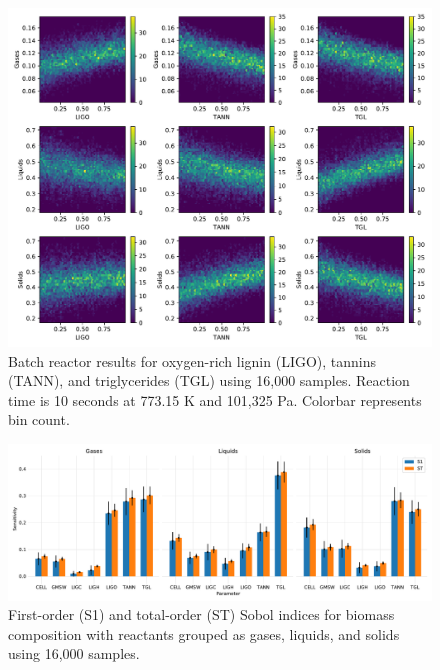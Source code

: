 \begin{figure}[H]
    \centering
    \includegraphics[width=\textwidth]{figures/sa-hexbin2-n1000.pdf}
    \caption{Batch reactor results for oxygen-rich lignin (LIGO), tannins (TANN), and triglycerides (TGL) using 16,000 samples. Reaction time is 10 seconds at 773.15 K and 101,325 Pa. Colorbar represents bin count.}
\end{figure}

\begin{figure}[H]
    \centering
    \includegraphics[width=\textwidth]{figures/sa-bar-n1000.pdf}
    \caption{First-order (S1) and total-order (ST) Sobol indices for biomass composition with reactants grouped as gases, liquids, and solids using 16,000 samples.}
\end{figure}
